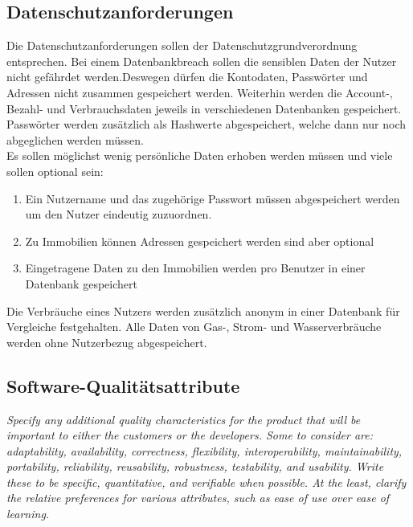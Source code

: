\subsection{Datenschutzanforderungen}
Die Datenschutzanforderungen sollen der Datenschutzgrundverordnung entsprechen. Bei einem Datenbankbreach sollen die sensiblen Daten der Nutzer nicht gefährdet werden.Deswegen dürfen die Kontodaten, Passwörter und Adressen nicht zusammen gespeichert werden. Weiterhin werden die Account-, Bezahl- und Verbrauchsdaten jeweils in verschiedenen Datenbanken gespeichert. Passwörter werden zusätzlich als Hashwerte abgespeichert, welche dann nur noch abgeglichen werden müssen.\\
Es sollen möglichst wenig persönliche Daten erhoben werden müssen und viele sollen optional sein:

\begin{enumerate}
    \item Ein Nutzername und das zugehörige Passwort müssen abgespeichert werden um den Nutzer eindeutig zuzuordnen.
    \item Zu Immobilien können Adressen gespeichert werden sind aber optional
    \item Eingetragene Daten zu den Immobilien werden pro Benutzer in einer Datenbank gespeichert
\end{enumerate}
Die Verbräuche eines Nutzers werden zusätzlich anonym in einer Datenbank für Vergleiche festgehalten. Alle Daten von Gas-, Strom- und Wasserverbräuche werden ohne Nutzerbezug abgespeichert.

\subsection{Software-Qualitätsattribute}
\textit{Specify any additional quality characteristics for the product that will be important to either the customers or
the developers.
Some to consider are: adaptability, availability, correctness, flexibility, 
interoperability, maintainability, portability, reliability, reusability, 
robustness, testability, and usability. Write these to be specific, quantitative, 
and verifiable when possible.
At the least, clarify the relative preferences for various attributes, 
such as ease of use over ease of learning.}

